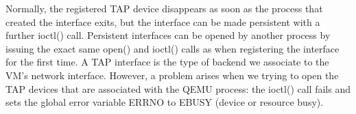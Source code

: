 Normally, the registered TAP device disappears as soon as the process that created the interface exits, but
the interface can be made persistent with a further ioctl() call. Persistent interfaces can be opened
by another process by issuing the exact same open() and ioctl() calls as when registering the interface
for the first time.
A TAP interface is the type of backend we associate to the VM's network interface. However, a problem arises
when we trying to open the TAP devices that are associated with the QEMU process: the ioctl() call
fails and sets the global error variable ERRNO to EBUSY (device or resource busy).










